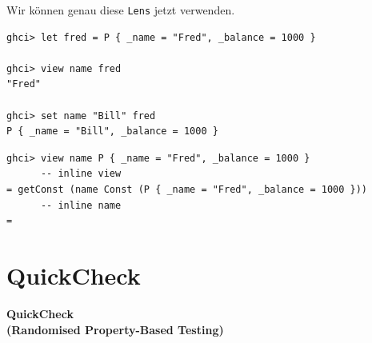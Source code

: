 \documentclass{beamer}
\begin{document}

\begin{frame}[fragile]

Wir können genau diese \texttt{Lens} jetzt verwenden.
\pause
\bigskip

\begin{verbatim}
ghci> let fred = P { _name = "Fred", _balance = 1000 }

ghci> view name fred
"Fred"

ghci> set name "Bill" fred
P { _name = "Bill", _balance = 1000 }
\end{verbatim}

\end{frame}


\begin{frame}[fragile]

\begin{verbatim}
ghci> view name P { _name = "Fred", _balance = 1000 }
      -- inline view
= getConst (name Const (P { _name = "Fred", _balance = 1000 }))
      -- inline name
= 
\end{verbatim}

\end{frame}

\section{QuickCheck}

\begin{frame}

\begin{center}
\Large
\textbf{QuickCheck\\(Randomised Property-Based Testing)}
\end{center}

\end{frame}
\end{document}
